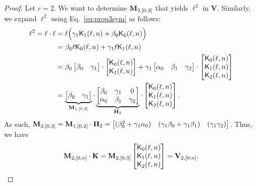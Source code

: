\documentclass[11pt]{llncs}
\begin{document}
\begin{proof}
	Let $r = 2$. We want to determine $\mathbf{M}_{2,[0,3]}$ that yields $\ell^2$ in $\mathbf{V}$.
	Similarly, we expand $\ell^2$ using Eq.~\eqref{eq:prop3sym} as follows:
	\begin{equation*}
	\begin{split}
	\ell^2 = \ell \cdot \ell &= \ell \Big(\gamma_1 \mathsf{K}_{1}(\ell,n) + \beta_0 \mathsf{K}_{0}(\ell,n)\Big)\\
	& = \beta_0 \ell  \mathsf{K}_{0}(\ell,n) + \gamma_1 \ell \mathsf{K}_{1}(\ell,n) \\
	& = \beta_0  \begin{bmatrix}\beta_0 & \gamma_1\end{bmatrix} \cdot \begin{bmatrix}\mathsf{K}_{0}(\ell,n)\\\mathsf{K}_{1}(\ell,n)\end{bmatrix} + \gamma_1 \begin{bmatrix}\alpha_0 & \beta_1 & \gamma_2 \end{bmatrix} \cdot \begin{bmatrix}\mathsf{K}_{0}(\ell,n)\\\mathsf{K}_{1}(\ell,n)\\\mathsf{K}_{2}(\ell,n)\end{bmatrix}  \\
	&= \underbrace{\begin{bmatrix}\beta_0 & \gamma_1\end{bmatrix}}_{\mathbf{M}_{1,[0,2]}} \cdot \underbrace{\begin{bmatrix}\beta_0 & \gamma_1 & 0\\\alpha_0 & \beta_1 & \gamma_2\end{bmatrix}}_{\mathbf{H}_2}\cdot \begin{bmatrix}\mathsf{K}_{0}(\ell,n)\\\mathsf{K}_{1}(\ell,n)\\\mathsf{K}_{2}(\ell,n)\end{bmatrix}.
	\end{split}
	\end{equation*}
	As such, $\mathbf{M}_{2,[0,3]} = \mathbf{M}_{1,[0,2]}\cdot \mathbf{H}_2 =\begin{bmatrix}(\beta_0^2 + \gamma_1\alpha_0) & (\gamma_1\beta_0 + \gamma_1\beta_1) & (\gamma_1\gamma_2)\end{bmatrix}$.
	Thus,
	we have
	\[
	\mathbf{M}_{2,[0,n]}\cdot \mathbf{K} = \mathbf{M}_{2,[0,3]} \begin{bmatrix}\mathsf{K}_{0}(\ell,n)\\\mathsf{K}_{1}(\ell,n)\\\mathsf{K}_{2}(\ell,n)\end{bmatrix} = \mathbf{V}_{2,[0,n]}.
	\]



\end{proof}
\end{document}
